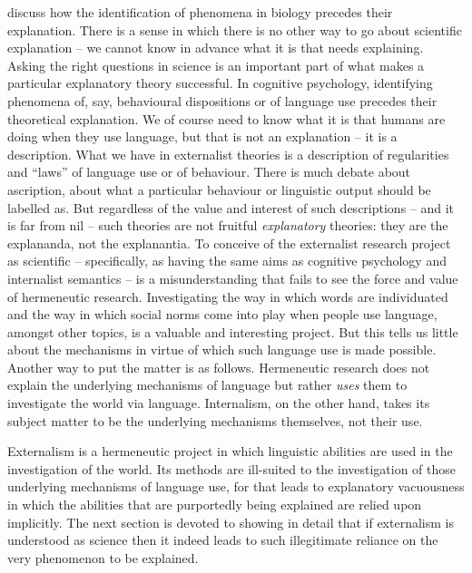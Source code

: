 \citet{BechtelAbrahamsen2005} discuss how the identification of phenomena in biology precedes their explanation. There is a sense in which there is no other way to go about scientific explanation – we cannot know in advance what it is that needs explaining. Asking the right questions in science is an important part of what makes a particular explanatory theory successful. In cognitive psychology, identifying phenomena of, say, behavioural dispositions or of language use precedes their theoretical explanation. We of course need to know what it is that humans are doing when they use language, but that is not an explanation – it is a description. What we have in externalist theories is a description of regularities and “laws” of language use or of behaviour. There is much debate about ascription, about what a particular behaviour or linguistic output should be labelled as. But regardless of the value and interest of such descriptions – and it is far from nil – such theories are not fruitful \textit{explanatory} theories: they are the explananda, not the explanantia. To conceive of the externalist research project as scientific – specifically, as having the same aims as cognitive psychology and internalist semantics – is a misunderstanding that fails to see the force and value of hermeneutic research. Investigating the way in which words are individuated and the way in which social norms come into play when people use language, amongst other topics, is a valuable and interesting project. But this tells us little about the mechanisms in virtue of which such language use is made possible. Another way to put the matter is as follows. Hermeneutic research does not explain the underlying mechanisms of language but rather \textit{uses} them to investigate the world via language. Internalism, on the other hand, takes its subject matter to be the underlying mechanisms themselves, not their use.

Externalism is a hermeneutic project in which linguistic abilities are used in the investigation of the world. Its methods are ill-suited to the investigation of those underlying mechanisms of language use, for that leads to explanatory vacuousness in which the abilities that are purportedly being explained are relied upon implicitly. The next section is devoted to showing in detail that if externalism is understood as science then it indeed leads to such illegitimate reliance on the very phenomenon to be explained.


